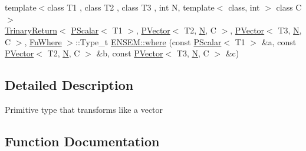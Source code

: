 \begin{DoxyCompactItemize}
\item 
{\footnotesize template$<$class T1 , class T2 , class T3 , int N, template$<$ class, int $>$ class C$>$ }\\\mbox{\hyperlink{structENSEM_1_1TrinaryReturn}{Trinary\+Return}}$<$ \mbox{\hyperlink{classENSEM_1_1PScalar}{P\+Scalar}}$<$ T1 $>$, \mbox{\hyperlink{classENSEM_1_1PVector}{P\+Vector}}$<$ T2, \mbox{\hyperlink{operator__name__util_8cc_a7722c8ecbb62d99aee7ce68b1752f337}{N}}, C $>$, \mbox{\hyperlink{classENSEM_1_1PVector}{P\+Vector}}$<$ T3, \mbox{\hyperlink{operator__name__util_8cc_a7722c8ecbb62d99aee7ce68b1752f337}{N}}, C $>$, \mbox{\hyperlink{structENSEM_1_1FnWhere}{Fn\+Where}} $>$\+::Type\+\_\+t \mbox{\hyperlink{group__primvector_ga17c089532ed62b8ac706539d3d0ecd14}{E\+N\+S\+E\+M\+::where}} (const \mbox{\hyperlink{classENSEM_1_1PScalar}{P\+Scalar}}$<$ T1 $>$ \&a, const \mbox{\hyperlink{classENSEM_1_1PVector}{P\+Vector}}$<$ T2, \mbox{\hyperlink{operator__name__util_8cc_a7722c8ecbb62d99aee7ce68b1752f337}{N}}, C $>$ \&b, const \mbox{\hyperlink{classENSEM_1_1PVector}{P\+Vector}}$<$ T3, \mbox{\hyperlink{operator__name__util_8cc_a7722c8ecbb62d99aee7ce68b1752f337}{N}}, C $>$ \&c)
\end{DoxyCompactItemize}


\subsection{Detailed Description}
Primitive type that transforms like a vector 

\subsection{Function Documentation}
\mbox{\label{group__primvector_ga8b4f68b7aa172234ddbd8490f45bb13c}} 
